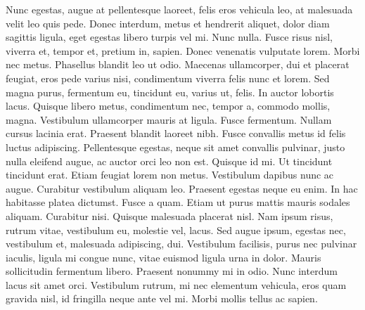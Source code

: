 Nunc egestas, augue at pellentesque laoreet, felis eros vehicula leo, at malesuada velit leo quis pede. Donec interdum, metus et hendrerit aliquet, dolor diam sagittis ligula, eget egestas libero turpis vel mi. Nunc nulla. Fusce risus nisl, viverra et, tempor et, pretium in, sapien. Donec venenatis vulputate lorem. Morbi nec metus. Phasellus blandit leo ut odio. Maecenas ullamcorper, dui et placerat feugiat, eros pede varius nisi, condimentum viverra felis nunc et lorem. Sed magna purus, fermentum eu, tincidunt eu, varius ut, felis. In auctor lobortis lacus. Quisque libero metus, condimentum nec, tempor a, commodo mollis, magna. Vestibulum ullamcorper mauris at ligula. Fusce fermentum. Nullam cursus lacinia erat. Praesent blandit laoreet nibh. Fusce convallis metus id felis luctus adipiscing. Pellentesque egestas, neque sit amet convallis pulvinar, justo nulla eleifend augue, ac auctor orci leo non est. Quisque id mi. Ut tincidunt tincidunt erat. Etiam feugiat lorem non metus. Vestibulum dapibus nunc ac augue. Curabitur vestibulum aliquam leo. Praesent egestas neque eu enim. In hac habitasse platea dictumst. Fusce a quam. Etiam ut purus mattis mauris sodales aliquam. Curabitur nisi. Quisque malesuada placerat nisl. Nam ipsum risus, rutrum vitae, vestibulum eu, molestie vel, lacus. Sed augue ipsum, egestas nec, vestibulum et, malesuada adipiscing, dui. Vestibulum facilisis, purus nec pulvinar iaculis, ligula mi congue nunc, vitae euismod ligula urna in dolor. Mauris sollicitudin fermentum libero. Praesent nonummy mi in odio. Nunc interdum lacus sit amet orci. Vestibulum rutrum, mi nec elementum vehicula, eros quam gravida nisl, id fringilla neque ante vel mi. Morbi mollis tellus ac sapien.

